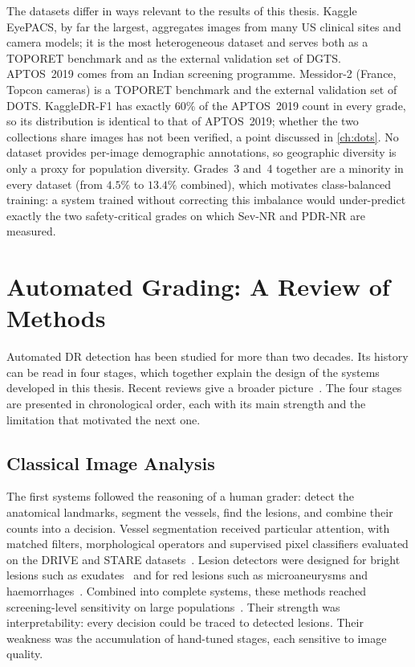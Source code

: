 The datasets differ in ways relevant to the results of this thesis. Kaggle EyePACS, by
far the largest, aggregates images from many US clinical sites and camera models; it is
the most heterogeneous dataset and serves both as a TOPORET benchmark and as the external
validation set of DGTS. APTOS~2019 comes from an Indian screening programme. Messidor-2
(France, Topcon cameras) is a TOPORET benchmark and the external validation set of DOTS.
KaggleDR-F1 has exactly $60\%$ of the APTOS~2019 count in every grade, so its distribution
is identical to that of APTOS~2019; whether the two collections share images has not been
verified, a point discussed in \cref{ch:dots}. No dataset provides per-image demographic
annotations, so geographic diversity is only a proxy for population diversity. Grades~3
and~4 together are a minority in every dataset (from $4.5\%$ to $13.4\%$ combined), which
motivates class-balanced training: a system trained without correcting this imbalance would
under-predict exactly the two safety-critical grades on which Sev-NR and PDR-NR are
measured.

\section{Automated Grading: A Review of Methods}
\label{sec:decade}

Automated DR detection has been studied for more than two decades. Its history can be read
in four stages, which together explain the design of the systems developed in this
thesis. Recent reviews give a broader picture~\cite{tsiknakis2021review,alyoubi2020review,
ting2019ophthalmology}. The four stages are presented in chronological order, each with its main strength and the limitation that motivated the next one.

\subsection{Classical Image Analysis}

The first systems followed the reasoning of a human grader: detect the anatomical
landmarks, segment the vessels, find the lesions, and combine their counts into a
decision. Vessel segmentation received particular attention, with matched filters,
morphological operators and supervised pixel classifiers evaluated on the DRIVE and STARE
datasets~\cite{hoover2000stare,staal2004drive,fraz2012vessel}. Lesion detectors were
designed for bright lesions such as exudates~\cite{walter2002exudates} and for red lesions
such as microaneurysms and haemorrhages~\cite{niemeijer2005redlesions}. Combined into
complete systems, these methods reached screening-level sensitivity on large
populations~\cite{abramoff2008diabetes,abramoff2010retinal}. Their strength was
interpretability: every decision could be traced to detected lesions. Their weakness was
the accumulation of hand-tuned stages, each sensitive to image quality.

